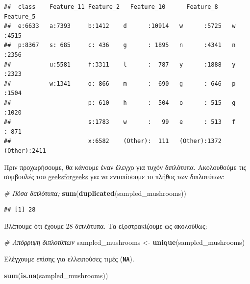 \documentclass[
]{article}
\newenvironment{Shaded}{\begin{snugshade}}{\end{snugshade}}
\newcommand{\CommentTok}[1]{\textcolor[rgb]{0.56,0.35,0.01}{\textit{#1}}}
\newcommand{\FunctionTok}[1]{\textcolor[rgb]{0.13,0.29,0.53}{\textbf{#1}}}
\newcommand{\NormalTok}[1]{#1}
\newcommand{\OtherTok}[1]{\textcolor[rgb]{0.56,0.35,0.01}{#1}}
\begin{document}
\begin{verbatim}
##  class    Feature_11 Feature_2   Feature_10      Feature_8      Feature_5   
##  e:6633   a:7393     b:1412    d      :10914   w      :5725   w      :4515  
##  p:8367   s: 685     c: 436    g      : 1895   n      :4341   n      :2356  
##           u:5581     f:3311    l      :  787   y      :1888   y      :2323  
##           w:1341     o: 866    m      :  690   g      : 646   p      :1504  
##                      p: 610    h      :  504   o      : 515   g      :1020  
##                      s:1783    w      :   99   e      : 513   f      : 871  
##                      x:6582    (Other):  111   (Other):1372   (Other):2411
\end{verbatim}

Πριν προχωρήσουμε, θα κάνουμε έναν έλεγχο για τυχόν διπλότυπα.
Ακολουθούμε τις συμβουλές του
\href{https://www.geeksforgeeks.org/r-language/identify-and-remove-duplicate-data-in-r/}{geeksforgeeks}
για να εντοπίσουμε το πλήθος των διπλοτύπων:

\begin{Shaded}
\begin{Highlighting}[]
\CommentTok{\# Πόσα διπλότυπα;}
\FunctionTok{sum}\NormalTok{(}\FunctionTok{duplicated}\NormalTok{(sampled\_mushrooms))}
\end{Highlighting}
\end{Shaded}

\begin{verbatim}
## [1] 28
\end{verbatim}

Βλέπουμε ότι έχουμε 28 διπλότυπα. Τα εξοστρακίζουμε ως ακολούθως:

\begin{Shaded}
\begin{Highlighting}[]
\CommentTok{\# Απόρριψη διπλοτύπων}
\NormalTok{sampled\_mushrooms }\OtherTok{\textless{}{-}} \FunctionTok{unique}\NormalTok{(sampled\_mushrooms)}
\end{Highlighting}
\end{Shaded}

Ελέγχουμε επίσης για ελλειπούσες τιμές (\textbf{\texttt{ΝΑ}}).

\begin{Shaded}
\begin{Highlighting}[]
\FunctionTok{sum}\NormalTok{(}\FunctionTok{is.na}\NormalTok{(sampled\_mushrooms))}
\end{Highlighting}
\end{Shaded}
\end{document}
